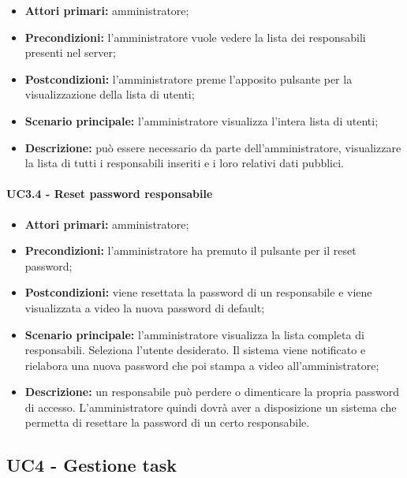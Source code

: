 \begin{itemize}
	\item 	\textbf{Attori primari:} amministratore;
	\item 	\textbf{Precondizioni:} l'amministratore vuole vedere la lista dei responsabili presenti nel server;
	\item 	\textbf{Postcondizioni:} l'amministratore preme l'apposito pulsante per la visualizzazione della lista di utenti;
	\item 	\textbf{Scenario principale:} l'amministratore visualizza l'intera lista di utenti;
	\item 	\textbf{Descrizione:} può essere necessario da parte dell'amministratore, visualizzare la lista di tutti i responsabili inseriti e i loro relativi dati pubblici.
\end{itemize}

\paragraph{UC3.4 - Reset password responsabile}

\begin{itemize}
	\item 	\textbf{Attori primari:} amministratore;
	\item 	\textbf{Precondizioni:} l'amministratore ha premuto il pulsante per il reset password;
	\item 	\textbf{Postcondizioni:} viene resettata la password di un responsabile e viene visualizzata a video la nuova password di default;
	\item 	\textbf{Scenario principale:} l'amministratore visualizza la lista completa di responsabili. Seleziona l'utente desiderato. Il sistema viene notificato e rielabora una nuova password che poi stampa a video all'amministratore;
	\item 	\textbf{Descrizione:} un responsabile può perdere o dimenticare la propria password di accesso. L'amministratore quindi dovrà aver a disposizione un sistema che permetta di resettare la password di un certo responsabile.

\end{itemize}

\subsection{UC4 - Gestione task}

